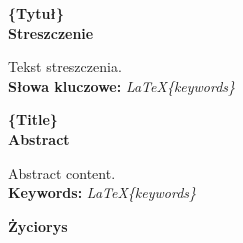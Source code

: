 \clearpage
{}
\newpage
\clearpage
{}
\begin{center}
	\fontsize{18pt}{12pt}\selectfont\textbf{\{Tytuł\}}\\
	\vspace{1cm}
	\fontsize{14pt}{12pt}\selectfont
	\textbf{Streszczenie}
\end{center}
Tekst streszczenia.\\
\noindent\textbf{Słowa kluczowe:} \textit{\LaTeX \{keywords\}}\\
\vspace{1.5cm}

\begin{center}
	\fontsize{18pt}{12pt}\selectfont\textbf{\{Title\}}\\
	\vspace{1cm}
	\fontsize{14pt}{12pt}\selectfont
	\textbf{Abstract}
\end{center}
Abstract content.\\
\noindent\textbf{Keywords:} \textit{\LaTeX \{keywords\}}\\
\vspace{1.5cm}

\newpage
\begin{center}
	\textbf{Życiorys}
\end{center}
\vspace{1cm}
\lipsum[4-5]
